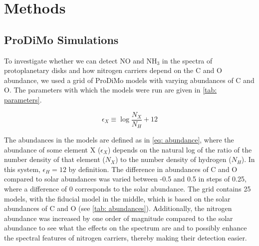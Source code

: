 \documentclass[twoside, single, authoryear, semicolon, 12pt]{lion-msc}
\newcommand{\4}{$_4$}
\newcommand{\3}{$_3$}
\newcommand{\2}{$_2$}
\begin{document}
\chapter{Methods}\label{Ch: Methods}

\section{ProDiMo Simulations}
To investigate whether we can detect NO and NH\3 in the spectra of protoplanetary disks and how nitrogen carriers depend on the C and O abundance, we used a grid of ProDiMo models with varying abundances of C and O. The parameters with which the models were run are given in \autoref{tab: parameters}.

\begin{equation}
    \epsilon_X\equiv\log\frac{N_X}{N_H}+12
\label{eq: abundance}
\end{equation}

The abundances in the models are defined as in \autoref{eq: abundance}, where the abundance of some element X ($\epsilon_X$) depends on the natural log of the ratio of the number density of that element ($N_X$) to the number density of hydrogen ($N_H$). In this system, $\epsilon_H=12$ by definition. The difference in abundances of C and O compared to solar abundances was varied between -0.5 and 0.5 in steps of 0.25, where a difference of 0 corresponds to the solar abundance. The grid contains 25 models, with the fiducial model in the middle, which is based on the solar abundances of C and O (see \autoref{tab: abundances}). Additionally, the nitrogen abundance was increased by one order of magnitude compared to the solar abundance to see what the effects on the spectrum are and to possibly enhance the spectral features of nitrogen carriers, thereby making their detection easier.
\end{document}
